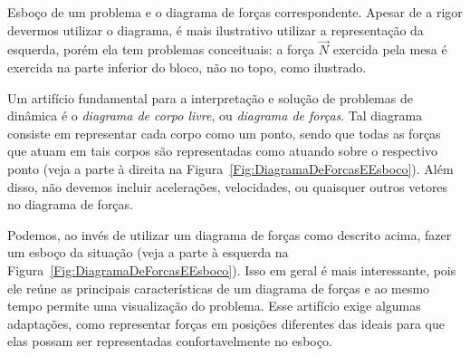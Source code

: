 \begin{marginfigure}[3cm]
\centering
{}
\caption{Esboço de um problema e o diagrama de forças correspondente. Apesar de a rigor devermos utilizar o diagrama, é mais ilustrativo utilizar a representação da esquerda, porém ela tem problemas conceituais: a força $\vec{N}$ exercida pela mesa é exercida na parte inferior do bloco, não no topo, como ilustrado.\label{Fig:DiagramaDeForcasEEsboco}}
\end{marginfigure}

Um artifício fundamental para a interpretação e solução de problemas de dinâmica é o \emph{diagrama de corpo livre}, ou \emph{diagrama de forças}. Tal diagrama consiste em representar cada corpo como um ponto, sendo que todas as forças que atuam em tais corpos são representadas como atuando sobre o respectivo ponto (veja a parte à direita na Figura~\ref{Fig:DiagramaDeForcasEEsboco}). Além disso, não devemos incluir acelerações, velocidades, ou quaisquer outros vetores no diagrama de forças.

Podemos, ao invés de utilizar um diagrama de forças como descrito acima, fazer um esboço da situação (veja a parte à esquerda na Figura~\ref{Fig:DiagramaDeForcasEEsboco}). Isso em geral é mais interessante, pois ele reúne as principais características de um diagrama de forças e ao mesmo tempo permite uma visualização do problema. Esse artifício exige algumas adaptações, como representar forças em posições diferentes das ideais para que elas possam ser representadas confortavelmente no esboço.


